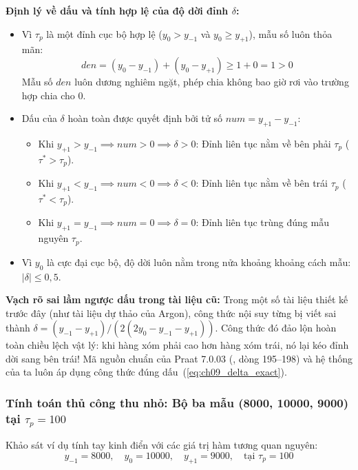 \begin{equationcard}
\textbf{Định lý về dấu và tính hợp lệ của độ dời đỉnh $\delta$:}
\begin{itemize}[leftmargin=1.5em, itemsep=2pt]
    \item Vì $\tau_p$ là một đỉnh cục bộ hợp lệ ($y_0 > y_{-1}$ và $y_0 \ge y_{+1}$), mẫu số luôn thỏa mãn:
    \begin{equation}
    den = (y_0 - y_{-1}) + (y_0 - y_{+1}) \ge 1 + 0 = 1 > 0
    \end{equation}
    Mẫu số $den$ luôn dương nghiêm ngặt, phép chia không bao giờ rơi vào trường hợp chia cho 0.
    \item Dấu của $\delta$ hoàn toàn được quyết định bởi tử số $num = y_{+1} - y_{-1}$:
    \begin{itemize}
        \item Khi $y_{+1} > y_{-1} \implies num > 0 \implies \delta > 0$: Đỉnh liên tục nằm về bên phải $\tau_p$ ($\tau^* > \tau_p$).
        \item Khi $y_{+1} < y_{-1} \implies num < 0 \implies \delta < 0$: Đỉnh liên tục nằm về bên trái $\tau_p$ ($\tau^* < \tau_p$).
        \item Khi $y_{+1} = y_{-1} \implies num = 0 \implies \delta = 0$: Đỉnh liên tục trùng đúng mẫu nguyên $\tau_p$.
    \end{itemize}
    \item Vì $y_0$ là cực đại cục bộ, độ dời luôn nằm trong nửa khoảng khoảng cách mẫu: $|\delta| \le 0{,}5$.
\end{itemize}
\end{equationcard}

\textbf{Vạch rõ sai lầm ngược dấu trong tài liệu cũ:} Trong một số tài liệu thiết kế trước đây (như tài liệu dự thảo của Argon), công thức nội suy từng bị viết sai thành $\delta = (y_{-1} - y_{+1}) / (2(2y_0 - y_{-1} - y_{+1}))$. Công thức đó đảo lộn hoàn toàn chiều lệch vật lý: khi hàng xóm phải cao hơn hàng xóm trái, nó lại kéo đỉnh dời sang bên trái! Mã nguồn chuẩn của Praat 7.0.03 (, dòng 195--198) và hệ thống của ta luôn áp dụng công thức đúng dấu~(\ref{eq:ch09_delta_exact}).

\subsubsection*{Tính toán thủ công thu nhỏ: Bộ ba mẫu (8000, 10000, 9000) tại $\tau_p = 100$}
Khảo sát ví dụ tính tay kinh điển với các giá trị hàm tương quan nguyên:
\begin{equation}
y_{-1} = 8000, \quad y_0 = 10000, \quad y_{+1} = 9000, \quad \text{tại } \tau_p = 100
\end{equation}

